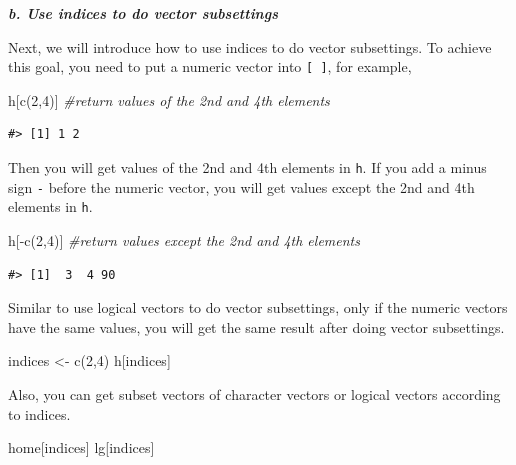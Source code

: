 \documentclass[
]{book}
\newenvironment{Shaded}{\begin{snugshade}}{\end{snugshade}}
\newcommand{\CommentTok}[1]{\textcolor[rgb]{0.56,0.35,0.01}{\textit{#1}}}
\newcommand{\DecValTok}[1]{\textcolor[rgb]{0.00,0.00,0.81}{#1}}
\newcommand{\FunctionTok}[1]{\textcolor[rgb]{0.00,0.00,0.00}{#1}}
\newcommand{\NormalTok}[1]{#1}
\newcommand{\OtherTok}[1]{\textcolor[rgb]{0.56,0.35,0.01}{#1}}
\newcommand{\SpecialCharTok}[1]{\textcolor[rgb]{0.00,0.00,0.00}{#1}}
\begin{document}
\textbf{\emph{b. Use indices to do vector subsettings}}

Next, we will introduce how to use indices to do vector subsettings. To achieve this goal, you need to put a numeric vector into \texttt{{[}\ {]}}, for example,

\begin{Shaded}
\begin{Highlighting}[]
\NormalTok{h[}\FunctionTok{c}\NormalTok{(}\DecValTok{2}\NormalTok{,}\DecValTok{4}\NormalTok{)]  }\CommentTok{\#return values of the 2nd and 4th elements}
\end{Highlighting}
\end{Shaded}

\begin{verbatim}
#> [1] 1 2
\end{verbatim}

Then you will get values of the 2nd and 4th elements in \texttt{h}. If you add a minus sign \texttt{-} before the numeric vector, you will get values except the 2nd and 4th elements in \texttt{h}.

\begin{Shaded}
\begin{Highlighting}[]
\NormalTok{h[}\SpecialCharTok{{-}}\FunctionTok{c}\NormalTok{(}\DecValTok{2}\NormalTok{,}\DecValTok{4}\NormalTok{)]  }\CommentTok{\#return values except the 2nd and 4th elements}
\end{Highlighting}
\end{Shaded}

\begin{verbatim}
#> [1]  3  4 90
\end{verbatim}

Similar to use logical vectors to do vector subsettings, only if the numeric vectors have the same values, you will get the same result after doing vector subsettings.

\begin{Shaded}
\begin{Highlighting}[]
\NormalTok{indices }\OtherTok{\textless{}{-}} \FunctionTok{c}\NormalTok{(}\DecValTok{2}\NormalTok{,}\DecValTok{4}\NormalTok{)}
\NormalTok{h[indices]}
\end{Highlighting}
\end{Shaded}

Also, you can get subset vectors of character vectors or logical vectors according to indices.

\begin{Shaded}
\begin{Highlighting}[]
\NormalTok{home[indices]}
\NormalTok{lg[indices]}
\end{Highlighting}
\end{Shaded}
\end{document}
